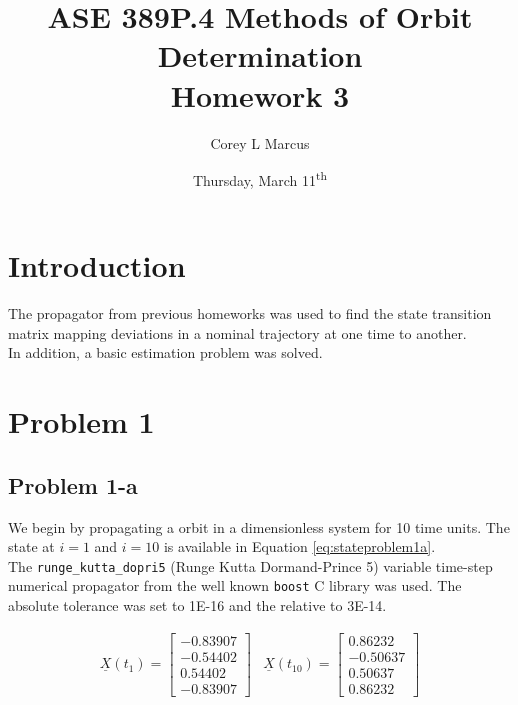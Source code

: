 \documentclass[11pt]{article}
\title{ASE 389P.4 Methods of Orbit Determination \\ Homework 3}
\author{Corey L Marcus} \date{Thursday, March 11\textsuperscript{th}}
\def\CC{{C\nolinebreak[4]\hspace{-.05em}\raisebox{.4ex}{\tiny\bf ++}}}
\begin{document}
\onehalfspace
\maketitle


\section{Introduction}

The propagator from previous homeworks was used to find the state transition matrix mapping deviations in a nominal trajectory at one time to another. \\

In addition, a basic estimation problem was solved.

\section{Problem 1}

\subsection{Problem 1-a}

We begin by propagating a orbit in a dimensionless system for 10 time units. The state at $i=1$ and $i=10$ is available in Equation \eqref{eq:stateproblem1a}. \\

The \texttt{runge\_kutta\_dopri5} (Runge Kutta Dormand-Prince 5) variable time-step numerical propagator from the well known \texttt{boost} {\CC} library was used. The absolute tolerance was set to 1E-16 and the relative to 3E-14.

\begin{equation}
	\label{eq:stateproblem1a}
	\begin{array}{lr}
		\underline{X}(t_1) = \begin{bmatrix}
			-0.83907 \\
			-0.54402 \\
			0.54402 \\
			-0.83907
		\end{bmatrix} & \underline{X}(t_{10}) = \begin{bmatrix}
			 0.86232 \\
			-0.50637 \\
			0.50637 \\
			0.86232
		\end{bmatrix}
	\end{array}
\end{equation}
\end{document}
